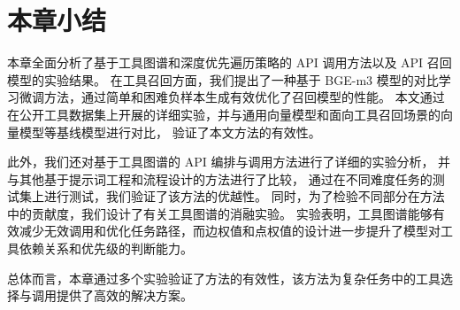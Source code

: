 \section{本章小结}

本章全面分析了基于工具图谱和深度优先遍历策略的 API 调用方法以及 API 召回模型的实验结果。
在工具召回方面，我们提出了一种基于 BGE-m3 模型的对比学习微调方法，通过简单和困难负样本生成有效优化了召回模型的性能。
本文通过在公开工具数据集上开展的详细实验，并与通用向量模型和面向工具召回场景的向量模型等基线模型进行对比，
验证了本文方法的有效性。

此外，我们还对基于工具图谱的 API 编排与调用方法进行了详细的实验分析，
并与其他基于提示词工程和流程设计的方法进行了比较，
通过在不同难度任务的测试集上进行测试，我们验证了该方法的优越性。
同时，为了检验不同部分在方法中的贡献度，我们设计了有关工具图谱的消融实验。
实验表明，工具图谱能够有效减少无效调用和优化任务路径，而边权值和点权值的设计进一步提升了模型对工具依赖关系和优先级的判断能力。

总体而言，本章通过多个实验验证了方法的有效性，该方法为复杂任务中的工具选择与调用提供了高效的解决方案。